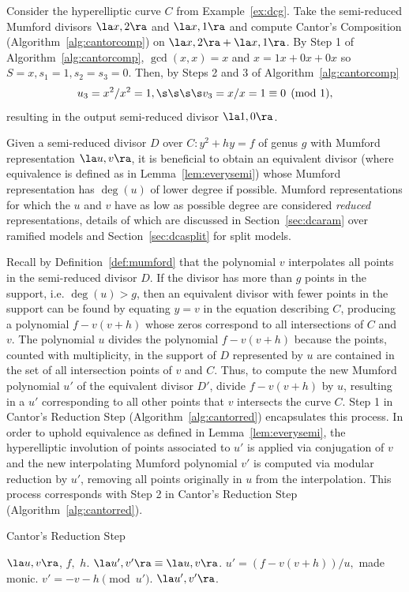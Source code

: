 \be
Consider the hyperelliptic curve $C$ from Example~\ref{ex:dcg}. Take the semi-reduced
Mumford divisors $\la x,2 \ra$ and $\la x,1 \ra$ and compute Cantor's Composition
(Algorithm~\ref{alg:cantorcomp}) on $\la x,2 \ra + \la x,1 \ra$. By Step 1 of
Algorithm~\ref{alg:cantorcomp}, $\gcd(x,x) = x$ and $x = 1x + 0x + 0x$ so $S =
x, s_1 = 1, s_2=s_3 = 0$. Then, by Steps 2 and 3 of
Algorithm~\ref{alg:cantorcomp} $$u_3 = x^2/x^2 = 1, \s\s\s\s v_3 = x/x =1 \equiv
0 \pmod{1},$$ resulting in the output semi-reduced divisor $\la 1,0 \ra$.
\ee

Given a semi-reduced divisor $D$ over $C : y^2 + hy = f$ of genus $g$ with
Mumford representation $\la u,v \ra$, it is beneficial to obtain an equivalent
divisor (where equivalence is defined as in Lemma~\ref{lem:everysemi}) whose
Mumford representation has $\deg(u)$ of lower degree if possible. Mumford
representations for which the $u$ and $v$ have as low as possible degree are
considered \emph{reduced} representations, details of which are discussed in
Section~\ref{sec:dcaram} over ramified models and Section~\ref{sec:dcasplit}
for split models.


Recall by Definition~\ref{def:mumford} that the polynomial $v$ interpolates all
points in the semi-reduced divisor $D$. If the divisor has more than $g$ points
in the support, i.e. $\deg(u) > g$, then an equivalent divisor with fewer points
in the support can be found by equating $y = v$ in the equation describing $C$,
producing a polynomial $f-v(v + h)$ whose zeros correspond to all intersections
of $C$ and $v$. The polynomial $u$ divides the polynomial $f-v(v + h)$ because
the points, counted with multiplicity, in the support of $D$ represented by $u$ are
contained in the set of all intersection points of $v$ and $C$. Thus, to compute
the new Mumford polynomial $u'$ of the equivalent divisor $D'$, divide $f-v(v +
h)$ by $u$, resulting in a $u'$ corresponding to all other points that $v$
intersects the curve $C$. Step 1 in Cantor's Reduction Step
(Algorithm~\ref{alg:cantorred}) encapsulates this process. In order to uphold
equivalence as defined in Lemma~\ref{lem:everysemi}, the hyperelliptic involution of
points associated to $u'$ is applied via conjugation of $v$ and the new
interpolating Mumford polynomial $v'$ is computed via modular reduction by
$u'$, removing all points originally in $u$ from the interpolation. This
process corresponds with Step 2 in Cantor's Reduction Step
(Algorithm~\ref{alg:cantorred}).


\begin{algorithm}[ht]
  \caption{Cantor's Reduction Step}
  \label{alg:cantorred}
  {\fontsize{12}{18}\selectfont
  \begin{algorithmic}[1]
  \Require $\la u,v \ra$, $f,$ $h.$
  \Ensure $\la u',v' \ra \equiv \la u,v \ra$.
  \vspace{5pt}
  \State $u' = (f-v(v + h))/u,$ made monic. 
  \State $v' = -v-h \pmod{u'}$.
  \State \Return $\la u',v' \ra$.
  \end{algorithmic}
  }
\end{algorithm}

